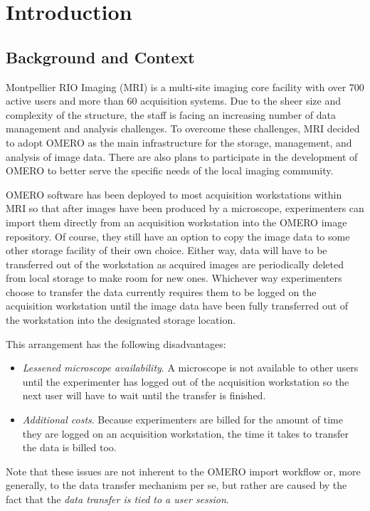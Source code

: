 
\section{Introduction}

\subsection{Background and Context}
Montpellier RIO Imaging (MRI) is a multi-site imaging core facility with over 700 active
users and more than 60 acquisition systems.
Due to the sheer size and complexity of the structure, the staff is facing an increasing
number of data management and analysis challenges. To overcome these challenges, MRI
decided to adopt OMERO\cite{ome:omero-pub,ome:omero-www} as the main infrastructure for
the storage, management, and analysis of image data. There are also plans to participate
in the development of OMERO to better serve the specific needs of the local imaging 
community.

OMERO software has been deployed to most acquisition workstations within MRI so that
after images have been produced by a microscope, experimenters can import them directly
from an acquisition workstation into the OMERO image repository. Of course, they still
have an option to copy the image data to some other storage facility of their own choice. 
Either way, data will have to be transferred out of the workstation as acquired images 
are periodically deleted from local storage to make room for new ones. Whichever way
experimenters choose to transfer the data currently requires them to be logged on the 
acquisition workstation until the image data have been fully transferred out of the
workstation into the designated storage location. 

This arrangement has the following disadvantages:
\begin{itemize}
\item \emph{Lessened microscope availability}. A microscope is not available to other
 users until the experimenter has logged out of the acquisition workstation so the next
 user will have to wait until the transfer is finished. 
\item \emph{Additional costs}. Because experimenters are billed for the amount of time 
 they are logged on an acquisition workstation, the time it takes to transfer the data 
 is billed too. 
\end{itemize}

Note that these issues are not inherent to the OMERO import workflow or, more generally,
to the data transfer mechanism per se, but rather are caused by the fact that the  
\emph{data transfer is tied to a user session}.


